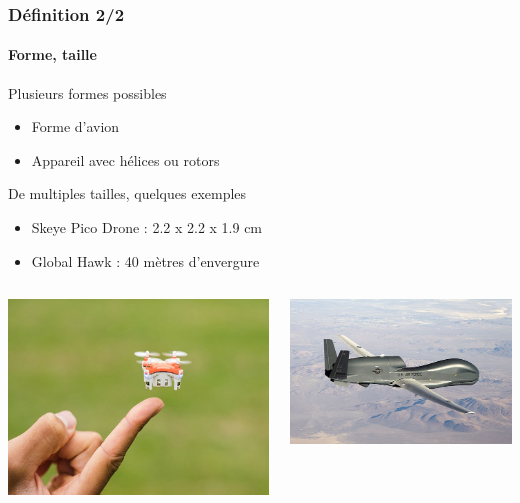 \documentclass{beamer}
\begin{document}
\begin{frame}
  \frametitle{Définition 2/2}
  \framesubtitle{Forme, taille}
  \begin{block}{Plusieurs formes possibles}
    \begin{itemize}
      \item Forme d'avion
      \item Appareil avec hélices ou rotors
    \end{itemize}
  \end{block}
  \begin{block}{De multiples tailles, quelques exemples}
    \begin{itemize}
      \item Skeye Pico Drone : 2.2 x 2.2 x 1.9 cm
      \item Global Hawk : 40 mètres d'envergure
    \end{itemize}
  \end{block}
  \begin{columns}
    \begin{column}{.5\textwidth}
      \begin{center}
        \includegraphics[width=.6\textwidth]{../Images/Skeye_Pico.jpg}
      \end{center}
    \end{column}
    \begin{column}{.5\textwidth}
      \begin{center}
        \includegraphics[width=.7\textwidth]{../Images/global_hawk.jpg}
      \end{center}
    \end{column}
  \end{columns}
\end{frame}
\end{document}
